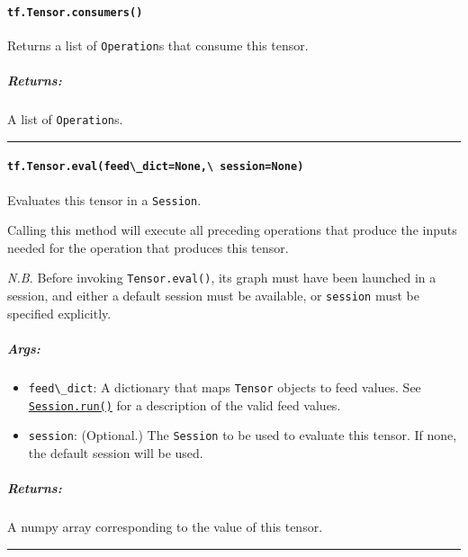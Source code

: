 \paragraph{\texorpdfstring{\lstinline{tf.Tensor.consumers()}
}{tf.Tensor.consumers() }}\label{tf.tensor.consumers}

Returns a list of \lstinline{Operation}s that consume this tensor.

\subparagraph{Returns: }\label{returns-19}

A list of \lstinline{Operation}s.

\begin{center}\rule{0.5\linewidth}{\linethickness}\end{center}

\paragraph{\texorpdfstring{\lstinline{tf.Tensor.eval(feed\_dict=None,\ session=None)}
}{tf.Tensor.eval(feed\_dict=None, session=None) }}\label{tf.tensor.evalfeedux5fdictnone-sessionnone}

Evaluates this tensor in a \lstinline{Session}.

Calling this method will execute all preceding operations that produce
the inputs needed for the operation that produces this tensor.

\emph{N.B.} Before invoking \lstinline{Tensor.eval()}, its graph must have
been launched in a session, and either a default session must be
available, or \lstinline{session} must be specified explicitly.

\subparagraph{Args: }\label{args-15}

\begin{itemize}
\tightlist
\item
  \lstinline{feed\_dict}: A dictionary that maps \lstinline{Tensor} objects to
  feed values. See
  \href{../../api_docs/python/client.md\#Session.run}{\lstinline{Session.run()}}
  for a description of the valid feed values.
\item
  \lstinline{session}: (Optional.) The \lstinline{Session} to be used to
  evaluate this tensor. If none, the default session will be used.
\end{itemize}

\subparagraph{Returns: }\label{returns-20}

A numpy array corresponding to the value of this tensor.

\begin{center}\rule{0.5\linewidth}{\linethickness}\end{center}

